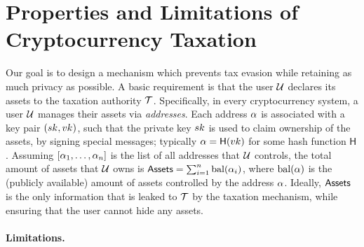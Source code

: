 \section{Properties and Limitations of Cryptocurrency Taxation}\label{sec:taxation}

Our goal is to design a mechanism which prevents tax evasion while retaining as
much privacy as possible. A basic requirement is that the user $\mathcal{U}$ declares
its assets to the taxation authority $\mathcal{T}$.  Specifically, in every
cryptocurrency system, a user $\mathcal{U}$ manages their assets via
\emph{addresses}. Each address $\alpha$ is associated with a key pair
$(sk_{}, vk_{})$, such that the private key $sk$ is used to claim ownership of
the assets, \eg by signing special messages; typically $\alpha =
\mathsf{H}(vk)$ for some hash function $\mathsf{H}$. Assuming
$[\alpha_1, \dots, \alpha_n]$ is the list of all addresses that $\mathcal{U}$
controls, the total amount of assets that $\mathcal{U}$ owns is $\mathsf{Assets} =
\sum_{i=1}^n \text{bal}(\alpha_i)$, where $\text{bal}(\alpha)$ is the (publicly
available) amount of assets controlled by the address $\alpha$.  Ideally,
$\mathsf{Assets}$ is the only information that is leaked to $\mathcal{T}$ by the taxation
mechanism, while ensuring that the user cannot hide any assets.

\paragraph{Limitations.}\label{subsec:limitations}

